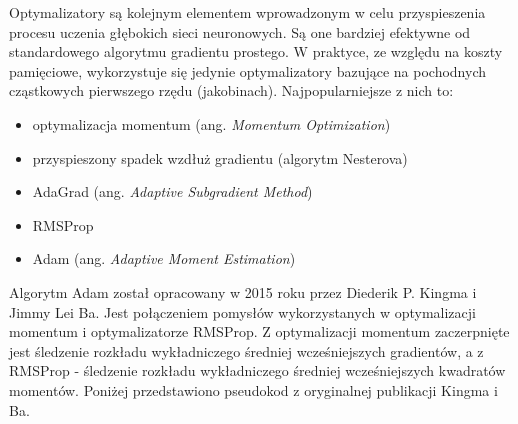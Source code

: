 \documentclass[a4paper,12pt]{article}
\numberwithin{figure}{section}
\begin{document}
    Optymalizatory są kolejnym elementem wprowadzonym w celu przyspieszenia procesu uczenia głębokich sieci neuronowych. Są one bardziej efektywne od standardowego algorytmu gradientu prostego. W praktyce, ze względu na koszty pamięciowe, wykorzystuje się jedynie optymalizatory bazujące na pochodnych cząstkowych pierwszego rzędu (jakobinach)\cite{UczenieMaszynowe2018}. Najpopularniejsze z nich to:
    \begin{itemize}
        \item optymalizacja momentum (ang. \textit{Momentum Optimization})
        \item przyspieszony spadek wzdłuż gradientu (algorytm Nesterova)
        \item AdaGrad (ang. \textit{Adaptive Subgradient Method})
        \item RMSProp
        \item Adam (ang. \textit{Adaptive Moment Estimation})
    \end{itemize}

    \bigskip

    Algorytm Adam został opracowany w 2015 roku przez Diederik P. Kingma i Jimmy Lei Ba\cite{AdamOptimization2015}. Jest połączeniem pomysłów wykorzystanych w optymalizacji momentum i optymalizatorze RMSProp. Z optymalizacji momentum zaczerpnięte jest śledzenie rozkładu wykładniczego średniej wcześniejszych gradientów, a z RMSProp - śledzenie rozkładu wykładniczego średniej wcześniejszych kwadratów momentów\cite{UczenieMaszynowe2018}. Poniżej przedstawiono pseudokod z oryginalnej publikacji Kingma i Ba.

    \bigskip
\end{document}
